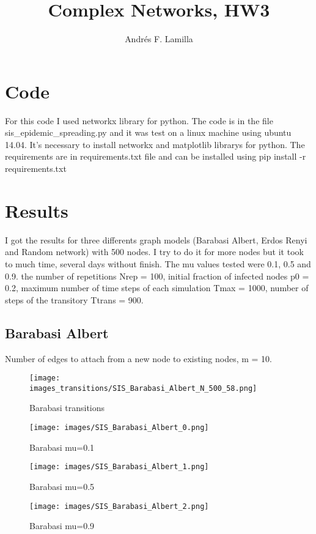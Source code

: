 \documentclass[letterpaper]{article}
\title{Complex Networks, HW3}
\author{Andrés F. Lamilla}
\begin{document}
\maketitle
\tableofcontents
\newpage
\section{Code}
For this code I used networkx library for python. The code is in the file sis\_epidemic\_spreading.py and it was test on a linux machine using ubuntu 14.04. It's necessary to install networkx and matplotlib librarys for python. The requirements are in requirements.txt file and can be installed using pip install -r requirements.txt

\section{Results}
I got the results for three differents graph models (Barabasi Albert, Erdos Renyi and Random network) with 500 nodes. I try to do it for more nodes but it took to much time, several days without finish. The mu values tested were 0.1, 0.5 and 0.9. the number of repetitions Nrep = 100, initial fraction of infected nodes p0 = 0.2, maximum number of time steps of each simulation Tmax = 1000, number of steps of the transitory Ttrans = 900.

\subsection{Barabasi Albert}
Number of edges to attach from a new node to existing nodes, m = 10.

\begin{figure}
  \centering
    \texttt{[image: images\_transitions/SIS\_Barabasi\_Albert\_N\_500\_58.png]}
  \caption{Barabasi transitions}
  \label{fig:1}
\end{figure}

\begin{figure}
  \centering
    \texttt{[image: images/SIS\_Barabasi\_Albert\_0.png]}
  \caption{Barabasi mu=0.1}
  \label{fig:2}
\end{figure}

\begin{figure}
  \centering
    \texttt{[image: images/SIS\_Barabasi\_Albert\_1.png]}
  \caption{Barabasi mu=0.5}
  \label{fig:3}
\end{figure}

\begin{figure}
  \centering
    \texttt{[image: images/SIS\_Barabasi\_Albert\_2.png]}
  \caption{Barabasi mu=0.9}
  \label{fig:4}
\end{figure}
\end{document}
